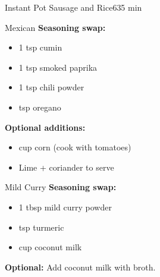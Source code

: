 \begin{recipebox}{Instant Pot Sausage and Rice}{6}{35 min}
\begin{variationbox}{Mexican}
  \textbf{Seasoning swap:}
  \begin{itemize}
    \item 1 tsp cumin
    \item 1 tsp smoked paprika
    \item 1 tsp chili powder
    \item {} tsp oregano
  \end{itemize}
  \textbf{Optional additions:}
  \begin{itemize}
    \item {} cup corn (cook with tomatoes)
    \item Lime + coriander to serve
  \end{itemize}
\end{variationbox}

\begin{variationbox}{Mild Curry}
  \textbf{Seasoning swap:}
  \begin{itemize}
    \item 1 tbsp mild curry powder
    \item {} tsp turmeric
    \item {} cup coconut milk
  \end{itemize}
  \textbf{Optional:} Add coconut milk with broth.
\end{variationbox}

\end{recipebox}
